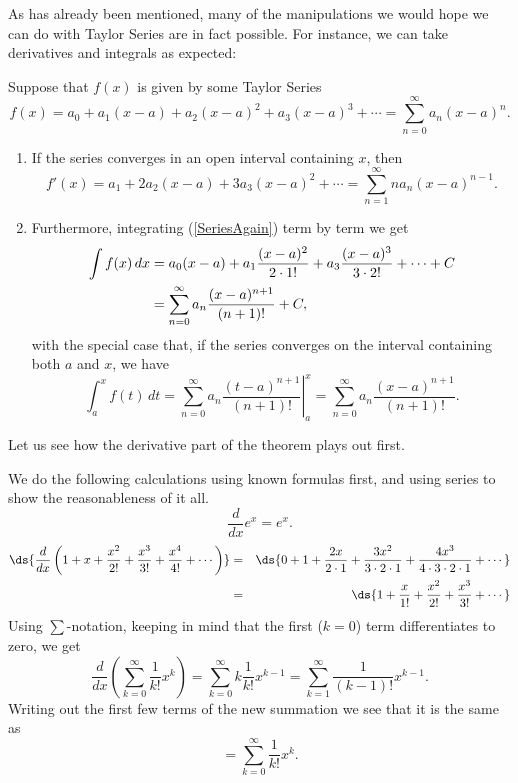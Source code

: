 As has already been mentioned, many of the manipulations
we would hope we can do with Taylor Series are in fact
possible.  For instance, we can take derivatives and integrals
as expected:
\bigskip

\begin{theorem} Suppose that $f(x)$ is given
by some Taylor Series
\begin{equation}
f(x)=a_0+a_1(x-a)+a_2(x-a)^2+a_3(x-a)^3+\cdots=\sum_{n=0}^\infty
a_n(x-a)^n.\label{SeriesAgain}\end{equation}
\begin{enumerate}
\item If the series converges in an open interval containing $x$,
then
\begin{equation}
f'(x)=a_1+2a_2(x-a)+3a_3(x-a)^2+\cdots=\sum_{n=1}^\infty na_n(x-a)^{n-1}.
\end{equation}
\item 
Furthermore, integrating (\ref{SeriesAgain}) term by term we get\footnotemark 
\begin{align}\int f(x)\,dx&=
a_0(x-a)+a_1\frac{(x-a)^2}{2\cdot1!}+a_3\frac{(x-a)^3}{3\cdot2!}
+\cdots+C\notag\\
&=\sum_{n=0}^\infty a_n\frac{(x-a)^{n+1}}{(n+1)!}+C,
\label{SeriesIntegral}\end{align}
with the special case that, if the series converges on the interval
containing both $a$ and $x$, we have 
\begin{equation}\int_a^xf(t)\,dt=\left.\sum_{n=0}^\infty a_n\frac{(t-a)^{n+1}}
 {(n+1)!}\right|_a^x
=\sum_{n=0}^\infty a_n\frac{(x-a)^{n+1}}{(n+1)!}.  
\label{SeriesDefiniteIntegral}\end{equation} 
\end{enumerate}\end{theorem}  
Let us see how the derivative part of the theorem plays out first.
\bigskip

\bex We do the following calculations using
known formulas first, and using series to show the reasonableness of it all.
$$\frac{d}{dx}e^x=e^x.$$
\begin{eqnarray*}\ds{\frac{d}{dx}\left(1+x+\frac{x^2}{2!}+\frac{x^3}{3!}+\frac{x^4}{4!}+\cdots
\right)}&=&\ds{0+1+\frac{2x}{2\cdot1}+\frac{3x^2}{3\cdot2\cdot1}+
\frac{4x^3}{4\cdot3\cdot2\cdot1}+\cdots }\\
&=&\ds{1+\frac{x}{1!}+\frac{x^2}{2!}+\frac{x^3}{3!}+\cdots}\end{eqnarray*}
Using $\sum$-notation, keeping in mind that the first ($k=0$) term
differentiates to zero, we get
$$\frac{d}{dx}\left(\sum_{k=0}^\infty\frac1{k!}x^k\right)
=\sum_{k=0}^\infty k\frac1{k!}x^{k-1}
=\sum_{k=1}^\infty\frac1{(k-1)!}x^{k-1}.$$
Writing out the first few terms of the new summation we see
that it is the same as 
$$=\sum_{k=0}^\infty\frac1{k!}x^k.$$
\eex

